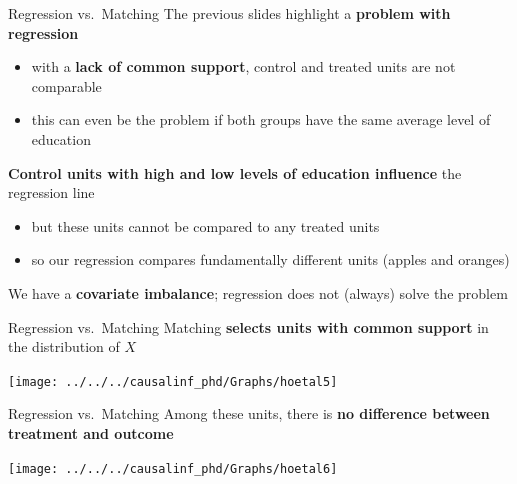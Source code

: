 \documentclass[
  ignorenonframetext,
  aspectratio=169, handout]{beamer}
\providecommand{\tightlist}{%
  \setlength{\itemsep}{0pt}\setlength{\parskip}{0pt}}
\newcommand{\brf}[1]{\textcolor{brickred}{\textbf{#1}}}
\begin{document}
\begin{frame}{Regression vs.~Matching}
\protect\hypertarget{regression-vs.-matching-4}{}
The previous slides highlight a \brf{problem with regression}

\begin{itemize}
\tightlist
\item
  with a \brf{lack of common support}, control and treated units are not
  comparable
\item
  this can even be the problem if both groups have the same average
  level of education
\end{itemize}

\vfill

\brf{Control units with high and low levels of education influence} the
regression line

\begin{itemize}
\tightlist
\item
  but these units cannot be compared to any treated units
\item
  so our regression compares fundamentally different units (apples and
  oranges)
\end{itemize}

\vfill

We have a \brf{covariate imbalance}; regression does not (always) solve
the problem
\end{frame}

\begin{frame}{Regression vs.~Matching}
\protect\hypertarget{regression-vs.-matching-5}{}
Matching \brf{selects units with common support} in the distribution of
\(X\)

\begin{center}\texttt{[image: ../../../causalinf\_phd/Graphs/hoetal5]} \end{center}
\end{frame}

\begin{frame}{Regression vs.~Matching}
\protect\hypertarget{regression-vs.-matching-6}{}
Among these units, there is
\brf{no difference between treatment and outcome}

\begin{center}\texttt{[image: ../../../causalinf\_phd/Graphs/hoetal6]} \end{center}
\end{frame}
\end{document}
